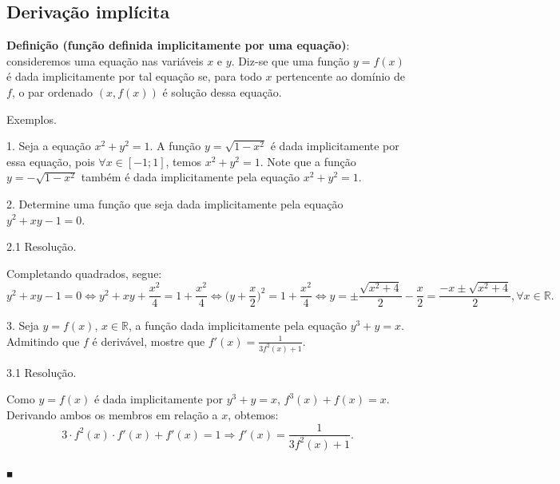 \documentclass{article}
\begin{document}
{\begin{newpage}
\subsection{Derivação implícita}
\hspace{12pt} \textbf{Definição (função definida implicitamente por uma equação)}: consideremos uma equação nas variáveis $x$ e $y$. Diz-se que uma função $y=f(x)$ é dada implicitamente por tal equação se, para todo $x$ pertencente ao domínio de $f$, o par ordenado $(x,f(x))$ é solução dessa equação.
\par
\vspace{0.3cm}
Exemplos.
\par
\begin{flushleft}
1. Seja a equação $x^2 + y^2 =1$. A função $y=\sqrt{1-x^2}$ é dada implicitamente por essa equação, pois $\forall x\in [-1;1]$, temos $x^2 + y^2 = 1$. Note que a função $y=-\sqrt{1-x^2}$ também é dada implicitamente pela equação $x^2 + y^2 = 1.$
\end{flushleft}
\par
\vspace{0.3cm}
\begin{flushleft}
2. Determine uma função que seja dada implicitamente pela equação $y^2 + xy - 1=0$.
\end{flushleft}
\par
\vspace{0.3cm}
\begin{flushleft}
2.1 Resolução.
\end{flushleft}
\par Completando quadrados, segue:
\begin{equation*} \displaystyle {y^2 + xy -1=0 \Leftrightarrow y^2 + xy + \frac{x^2}{4} = 1 + \frac{x^2}{4} \Leftrightarrow \Big(y + \frac{x}{2}\Big)^2 = 1 + \frac{x^2}{4} \Leftrightarrow y=\pm\frac{\sqrt{x^2 + 4}}{2} - \frac{x}{2} = \frac{-x \pm\sqrt{x^2 + 4}}{2}, \forall x\in\mathbb{R}} .\end{equation*}
\par
\vspace{0.3cm}
\begin{flushleft}
3. Seja $y=f(x)$, $x\in\mathbb{R}$, a função dada implicitamente pela equação $y^3 + y=x.$ Admitindo que $f$ é derivável, mostre que $f'(x) = \displaystyle{\frac{1}{3f^2(x) + 1}}$.
\end{flushleft}
\par
\vspace{0.3cm}
\begin{flushleft}
3.1 Resolução.
\end{flushleft}
\par Como $y=f(x)$ é dada implicitamente por $y^3 + y = x$, $f^3(x) + f(x) = x$. Derivando ambos os membros em relação a $x$, obtemos:
\begin{equation*} \displaystyle{ 3\cdot f^2(x)\cdot f'(x) + f'(x) = 1 \Rightarrow f'(x) = \frac{1}{3f^2(x) + 1}} .\end{equation*}\begin{flushright} $_{\blacksquare }$ \end{flushright}
\par
\vspace{0.3cm}

\end{newpage}}
\end{document}
